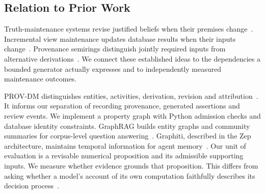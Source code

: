 \subsection{Relation to Prior Work}

Truth-maintenance systems revise justified beliefs when their premises
change~\cite{doyle1979}. Incremental view maintenance updates database results
when their inputs change~\cite{gupta1993}. Provenance semirings distinguish
jointly required inputs from alternative derivations~\cite{green2007}.
We connect these established ideas to the dependencies a bounded generator
actually expresses and to independently measured maintenance outcomes.

PROV-DM distinguishes entities, activities, derivation, revision and
attribution~\cite{prov2013}. It informs our separation of recording provenance,
generated assertions and review events. We implement a property graph with
Python admission checks and database identity constraints. GraphRAG builds entity
graphs and community summaries for corpus-level question answering~\cite{edge2025}.
Graphiti, described in the Zep architecture, maintains temporal information for
agent memory~\cite{rasmussen2025}. Our unit of evaluation is a revisable numerical
proposition and its admissible supporting inputs. We measure whether evidence
grounds that proposition. This differs from asking whether a model's account of
its own computation faithfully describes its decision process~\cite{turpin2023}.
